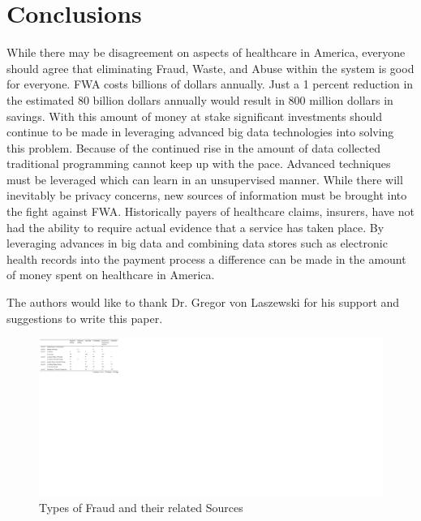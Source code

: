 \documentclass[sigconf]{acmart}
\begin{document}
\section{Conclusions}

While there may be disagreement on aspects of healthcare in America, everyone should agree that eliminating Fraud, Waste, and Abuse within the system is good for everyone.  FWA costs billions of dollars annually.  Just a 1 percent reduction in the estimated 80 billion dollars annually would result in 800 million dollars in savings.  With this amount of money at stake significant investments should continue to be made in leveraging advanced big data technologies into solving this problem.  Because of the continued rise in the amount of data collected traditional programming cannot keep up with the pace.  Advanced techniques must be leveraged which can learn in an unsupervised manner.  
While there will inevitably be privacy concerns, new sources of information must be brought into the fight against FWA.  Historically payers of healthcare claims, insurers, have not had the ability to require actual evidence that a service has taken place.  By leveraging advances in big data and combining data stores such as electronic health records into the payment process a difference can be made in the amount of money spent on healthcare in America.  

\begin{acks}

  The authors would like to thank Dr. Gregor von Laszewski for his
  support and suggestions to write this paper.

\end{acks}


 

\begin{figure}
    \includegraphics[scale=1.0]{TypesofFraud.jpg}
    \caption{Types of Fraud and their related Sources}
    \label{fig:TypesofFraud}
\end{figure}
\end{document}
